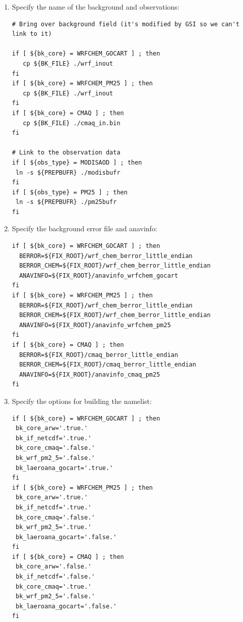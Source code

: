 \begin{enumerate}
\item Specify the name of the background and observations:
\begin{scriptsize}
\begin{verbatim}
# Bring over background field (it's modified by GSI so we can't link to it)

if [ ${bk_core} = WRFCHEM_GOCART ] ; then
   cp ${BK_FILE} ./wrf_inout
fi
if [ ${bk_core} = WRFCHEM_PM25 ] ; then
   cp ${BK_FILE} ./wrf_inout
fi
if [ ${bk_core} = CMAQ ] ; then
   cp ${BK_FILE} ./cmaq_in.bin
fi

# Link to the observation data
if [ ${obs_type} = MODISAOD ] ; then
 ln -s ${PREPBUFR} ./modisbufr
fi
if [ ${obs_type} = PM25 ] ; then
 ln -s ${PREPBUFR} ./pm25bufr
fi
\end{verbatim}
\end{scriptsize}
\item Specify the background error file and anavinfo:
\begin{scriptsize}
\begin{verbatim}
if [ ${bk_core} = WRFCHEM_GOCART ] ; then
  BERROR=${FIX_ROOT}/wrf_chem_berror_little_endian
  BERROR_CHEM=${FIX_ROOT}/wrf_chem_berror_little_endian
  ANAVINFO=${FIX_ROOT}/anavinfo_wrfchem_gocart
fi
if [ ${bk_core} = WRFCHEM_PM25 ] ; then
  BERROR=${FIX_ROOT}/wrf_chem_berror_little_endian
  BERROR_CHEM=${FIX_ROOT}/wrf_chem_berror_little_endian
  ANAVINFO=${FIX_ROOT}/anavinfo_wrfchem_pm25
fi
if [ ${bk_core} = CMAQ ] ; then
  BERROR=${FIX_ROOT}/cmaq_berror_little_endian
  BERROR_CHEM=${FIX_ROOT}/cmaq_berror_little_endian
  ANAVINFO=${FIX_ROOT}/anavinfo_cmaq_pm25
fi
\end{verbatim}
\end{scriptsize}
\item Specify the options for building the namelist:
\begin{scriptsize}
\begin{verbatim}
if [ ${bk_core} = WRFCHEM_GOCART ] ; then
 bk_core_arw='.true.'
 bk_if_netcdf='.true.'
 bk_core_cmaq='.false.'
 bk_wrf_pm2_5='.false.'
 bk_laeroana_gocart='.true.'
fi
if [ ${bk_core} = WRFCHEM_PM25 ] ; then
 bk_core_arw='.true.'
 bk_if_netcdf='.true.'
 bk_core_cmaq='.false.'
 bk_wrf_pm2_5='.true.'
 bk_laeroana_gocart='.false.'
fi
if [ ${bk_core} = CMAQ ] ; then
 bk_core_arw='.false.'
 bk_if_netcdf='.false.'
 bk_core_cmaq='.true.'
 bk_wrf_pm2_5='.false.'
 bk_laeroana_gocart='.false.'
fi
\end{verbatim}
\end{scriptsize}
\end{enumerate}

